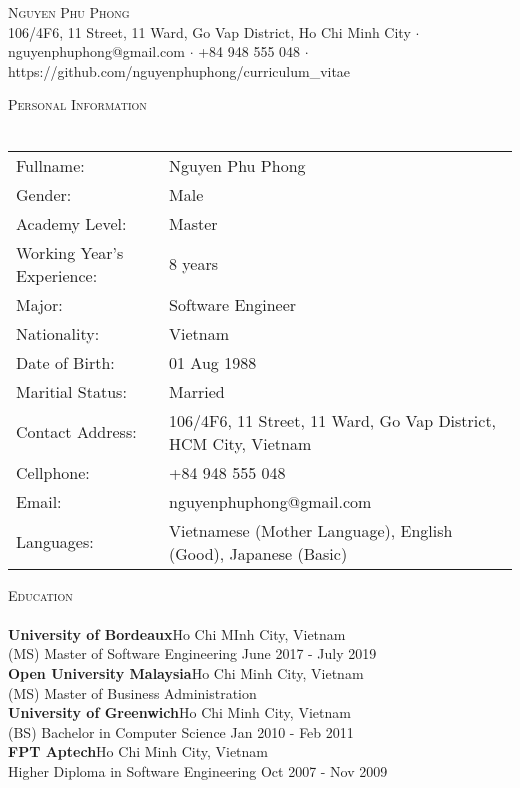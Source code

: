 \documentclass[a4paper]{article}
\newcommand{\lineunder} {
    \vspace*{-8pt} \\
    \hspace*{-18pt} \hrulefill \\
}
\newcommand{\header} [1] {
    {\hspace*{-18pt}\vspace*{6pt} \textsc{#1}}
    \vspace*{-6pt} \lineunder
}
\begin{document}
\vspace*{-40pt}

    

\vspace*{-10pt}
\begin{center}
	{\Huge \scshape {Nguyen Phu Phong}}\\
	106/4F6, 11 Street, 11 Ward, Go Vap District, Ho Chi Minh City $\cdot$ nguyenphuphong@gmail.com $\cdot$ +84 948 555 048 $\cdot$ https://github.com/nguyenphuphong/curriculum\_vitae\\
\end{center}

\header{Personal Information}
\begin{tabular}{ l l }
	Fullname:                    & Nguyen Phu Phong \\
	Gender:                     & Male \\
	Academy Level: 			& Master \\
	Working Year's Experience: & 8 years \\
	Major: & Software Engineer \\
	Nationality:               & Vietnam \\
	Date of Birth:                       & 01 Aug 1988 \\
	Maritial Status:                     & Married                                              \\
	Contact Address:                    & 106/4F6, 11 Street, 11 Ward, Go Vap District, HCM City, Vietnam \\
	Cellphone:                         & +84 948 555 048 \\
	Email:			& nguyenphuphong@gmail.com \\
	Languages: & Vietnamese (Mother Language), English (Good), Japanese (Basic)
\end{tabular}
\vspace{2mm}

\header{Education}
\textbf{University of Bordeaux}\hfill Ho Chi MInh City, Vietnam\\
(MS) Master of Software Engineering \hfill June 2017 - July 2019\\
\vspace{2mm}
\textbf{Open University Malaysia}\hfill Ho Chi Minh City, Vietnam\\
(MS) Master of Business Administration\\
\vspace{2mm}
\textbf{University of Greenwich}\hfill Ho Chi Minh City, Vietnam\\
(BS) Bachelor in Computer Science \hfill Jan 2010 - Feb 2011\\
\vspace{2mm}
\textbf{FPT Aptech}\hfill Ho Chi Minh City, Vietnam\\
Higher Diploma in Software Engineering \hfill Oct 2007 - Nov 2009\\
\vspace{2mm}
\end{document}
